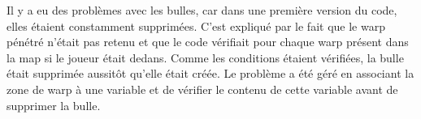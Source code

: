 \documentclass[11pt]{article}
\begin{document}
\begin{appendices}
Il y a eu des problèmes avec les bulles, car dans une première version du code, elles étaient constamment supprimées. C'est expliqué par le fait que le warp pénétré n'était pas retenu et que le code vérifiait pour chaque warp présent dans la map si le joueur était dedans. Comme les conditions étaient vérifiées, la bulle était supprimée aussitôt qu'elle était créée. Le problème a été géré en associant la zone de warp à une variable et de vérifier le contenu de cette variable avant de supprimer la bulle.

\end{appendices}
\end{document}
